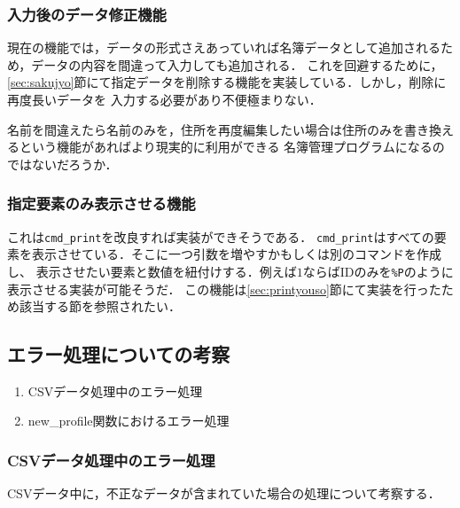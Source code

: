 \documentclass[a4j,11pt]{jarticle}
\begin{document}
\subsubsection{入力後のデータ修正機能}
現在の機能では，データの形式さえあっていれば名簿データとして追加されるため，データの内容を間違って入力しても追加される．
これを回避するために，\ref{sec:sakujyo}節にて指定データを削除する機能を実装している．しかし，削除に再度長いデータを
入力する必要があり不便極まりない．

名前を間違えたら名前のみを，住所を再度編集したい場合は住所のみを書き換えるという機能があればより現実的に利用ができる
名簿管理プログラムになるのではないだろうか．
\subsubsection{指定要素のみ表示させる機能}
これは\verb|cmd_print|を改良すれば実装ができそうである．
\verb|cmd_print|はすべての要素を表示させている．そこに一つ引数を増やすかもしくは別のコマンドを作成し、
表示させたい要素と数値を紐付けする．例えば$1$ならばIDのみを\verb|%P|のように表示させる実装が可能そうだ．
この機能は\ref{sec:printyouso}節にて実装を行ったため該当する節を参照されたい．

\subsection{エラー処理についての考察}
\begin{enumerate}
\setlength{\parskip}{2pt} \setlength{\itemsep}{2pt}
    \item CSVデータ処理中のエラー処理
    \item new\_profile関数におけるエラー処理
\end{enumerate}


\subsubsection{CSVデータ処理中のエラー処理}

CSVデータ中に，不正なデータが含まれていた場合の処理について考察する．
\end{document}
